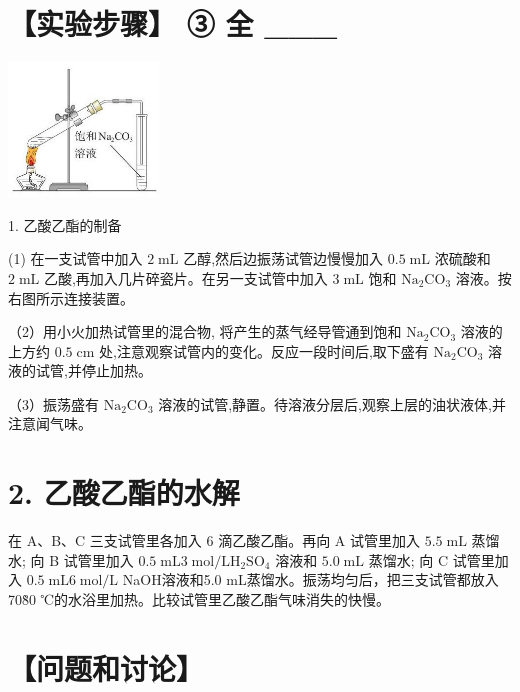 \documentclass[10pt]{article}
\begin{document}
\section*{【实验步骤】 ③ 全 \_\_\_}

\begin{center}
\includegraphics[max width=0.3\textwidth]{images/0190efc5-b58a-7c43-bfb0-e0a030df9cfd_103_982807.jpg}
\end{center}

1. 乙酸乙酯的制备

(1) 在一支试管中加入 \(2\mathrm{\;{mL}}\) 乙醇,然后边振荡试管边慢慢加入 \({0.5}\mathrm{\;{mL}}\) 浓硫酸和 \(2\mathrm{\;{mL}}\) 乙酸,再加入几片碎瓷片。在另一支试管中加入 \(3\mathrm{\;{mL}}\) 饱和 \({\mathrm{{Na}}}_{2}{\mathrm{{CO}}}_{3}\) 溶液。按右图所示连接装置。

（2）用小火加热试管里的混合物, 将产生的蒸气经导管通到饱和 \({\mathrm{{Na}}}_{2}{\mathrm{{CO}}}_{3}\) 溶液的上方约 \({0.5}\mathrm{\;{cm}}\) 处,注意观察试管内的变化。反应一段时间后,取下盛有 \({\mathrm{{Na}}}_{2}{\mathrm{{CO}}}_{3}\) 溶液的试管,并停止加热。

（3）振荡盛有 \({\mathrm{{Na}}}_{2}{\mathrm{{CO}}}_{3}\) 溶液的试管,静置。待溶液分层后,观察上层的油状液体,并注意闻气味。

\section*{2. 乙酸乙酯的水解}

在 A、B、C 三支试管里各加入 6 滴乙酸乙酯。再向 A 试管里加入 \({5.5}\mathrm{\;{mL}}\) 蒸馏水; 向 B 试管里加入 \({0.5}\mathrm{\;{mL}}3\mathrm{\;{mol}}/\mathrm{L}{\mathrm{H}}_{2}{\mathrm{{SO}}}_{4}\) 溶液和 \({5.0}\mathrm{\;{mL}}\) 蒸馏水; 向 C 试管里加入 \({0.5}\mathrm{\;{mL}}6\mathrm{\;{mol}}/\mathrm{L}\) NaOH溶液和5.0 mL蒸馏水。振荡均匀后，把三支试管都放入70\~80 ℃的水浴里加热。比较试管里乙酸乙酯气味消失的快慢。

\section*{【问题和讨论】}
\end{document}
